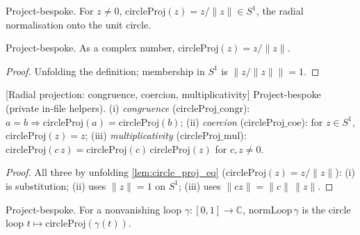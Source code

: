 \begin{definition}

  \label{def:circle_proj}
  Project-bespoke. For $z \ne 0$, $\mathrm{circleProj}(z) = z/\lVert z\rVert \in
  S^1$, the radial normalisation onto the unit circle.
\end{definition}

\begin{lemma}

  \label{lem:circle_proj_eq}
  Project-bespoke. As a complex number, $\mathrm{circleProj}(z) = z/\lVert z\rVert$.
\end{lemma}
\begin{proof}

\leanok
  Unfolding the definition; membership in $S^1$ is $\lVert z/\lVert z\rVert\rVert = 1$.
\end{proof}

\begin{lemma}

[Radial projection: congruence, coercion, multiplicativity]
  \label{lem:circle_proj_helpers}
  Project-bespoke (private in-file helpers). (i) \emph{congruence}
  ($\mathrm{circleProj\_congr}$): $a=b \Rightarrow \mathrm{circleProj}(a) =
  \mathrm{circleProj}(b)$; (ii) \emph{coercion} ($\mathrm{circleProj\_coe}$): for
  $z\in S^1$, $\mathrm{circleProj}(z) = z$; (iii) \emph{multiplicativity}
  ($\mathrm{circleProj\_mul}$): $\mathrm{circleProj}(c\,z) =
  \mathrm{circleProj}(c)\,\mathrm{circleProj}(z)$ for $c,z\ne 0$.
\end{lemma}
\begin{proof}

  All three by unfolding \cref{lem:circle_proj_eq} ($\mathrm{circleProj}(z) =
  z/\lVert z\rVert$): (i) is substitution; (ii) uses $\lVert z\rVert = 1$ on
  $S^1$; (iii) uses $\lVert c z\rVert = \lVert c\rVert\,\lVert z\rVert$.
\end{proof}

\begin{definition}

  \label{def:norm_loop}
  Project-bespoke. For a nonvanishing loop $\gamma : [0,1] \to \mathbb{C}$,
  $\mathrm{normLoop}\,\gamma$ is the circle loop $t \mapsto
  \mathrm{circleProj}(\gamma(t))$.
\end{definition}

